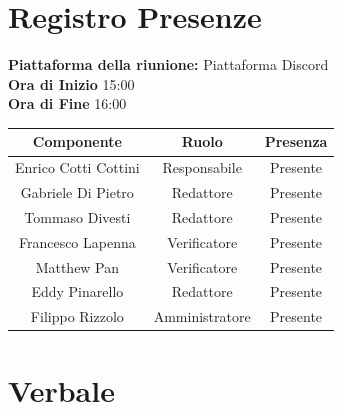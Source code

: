 \documentclass{article}
\begin{document}
\newpage
\tableofcontents
\newpage

\section{Registro Presenze}
\textbf{Piattaforma della riunione:} Piattaforma Discord \\
\textbf{Ora di Inizio} 15:00\\
\textbf{Ora di Fine} 16:00
\vspace{10mm} 

\begin{tabular}{|c|c|c|}
    \hline
    \textbf{Componente} & \textbf{Ruolo} & \textbf{Presenza}\\
    \hline
    Enrico Cotti Cottini & Responsabile & Presente \\ 
    \hline
    Gabriele Di Pietro & Redattore & Presente \\ 
    \hline
    Tommaso Divesti & Redattore & Presente \\ 
    \hline %
    Francesco Lapenna & Verificatore & Presente \\ 
    \hline
    Matthew Pan & Verificatore & Presente \\ 
    \hline %
    Eddy Pinarello & Redattore & Presente \\ 
    \hline %
    Filippo Rizzolo & Amministratore & Presente \\ 
    \hline %
\end{tabular}

\newpage
\section{Verbale}

\label{sec:verbale}
\end{document}
